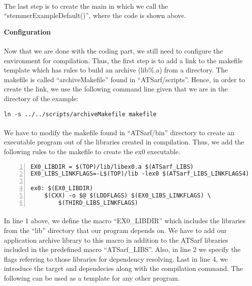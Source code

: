 \documentclass{article}
\begin{document}
\paragraph{}
The last step is to create the main in which we call the ``stemmerExampleDefault()'', where the code is shown above.

\begin{center}
\textbf{Configuration}
\end{center}

\paragraph{}
Now that we are done with the coding part, we still need to configure the environment for compilation. Thus, the first step is to add a link to the makefile template which has rules to build an archive (lib\%.a) from a directory. The makefile is called ``archiveMakefile'' found  in ``ATSarf/scripts''. Hence, in order to create the link, we use the following command line given that we are in the directory of the example:

\begin{Verbatim}
ln -s ../../scripts/archiveMakefile makefile
\end{Verbatim}

\paragraph{}
We have to modify the makefile found in ``ATSarf/bin'' directory to create an executable program out of the libraries created in compilation. Thus, we add the following rules to the makefile to create the ex0 executable.

\begin{Verbatim}[numbers=left]
EX0_LIBDIR = $(TOP)/lib/libex0.a $(ATSarf_LIBS)
EX0_LIBS_LINKFLAGS=-L$(TOP)/lib -lex0 $(ATSarf_LIBS_LINKFLAGS4)

ex0: $(EX0_LIBDIR)
	$(CXX) -o $@ $(LDDFLAGS) $(EX0_LIBS_LINKFLAGS) \
		$(THIRD_LIBS_LINKFLAGS)
\end{Verbatim}

\paragraph{}
In line 1 above, we define the macro ``EX0\_LIBDIR'' which includes the libraries from the ``lib'' directory that our program depends on. We have to add our application archive library to this macro in addition to the ATSarf libraries included in the predefined macro ``ATSarf\_LIBS''. Also, in line 2 we specify the flags referring to those libraries for dependency resolving. Last in line 4, we introduce the target and dependecies along with the compilation command. The following can be used as a template for any other program.
\end{document}
